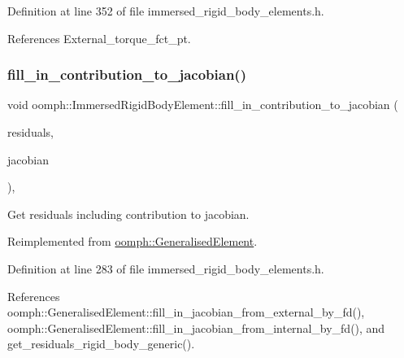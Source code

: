 Definition at line 352 of file immersed\+\_\+rigid\+\_\+body\+\_\+elements.\+h.



References External\+\_\+torque\+\_\+fct\+\_\+pt.

\mbox{\label{classoomph_1_1ImmersedRigidBodyElement_ac3a062f70718c9bf85a470c2eca2c60f}} 
\subsubsection{\texorpdfstring{fill\+\_\+in\+\_\+contribution\+\_\+to\+\_\+jacobian()}{fill\_in\_contribution\_to\_jacobian()}}
{\footnotesize\ttfamily void oomph\+::\+Immersed\+Rigid\+Body\+Element\+::fill\+\_\+in\+\_\+contribution\+\_\+to\+\_\+jacobian (\begin{DoxyParamCaption}\item[{\hyperlink{classoomph_1_1Vector}{Vector}$<$ double $>$ \&}]{residuals,  }\item[{\hyperlink{classoomph_1_1DenseMatrix}{Dense\+Matrix}$<$ double $>$ \&}]{jacobian }\end{DoxyParamCaption})\hspace{0.3cm}{\ttfamily [inline]}, {\ttfamily [virtual]}}



Get residuals including contribution to jacobian. 



Reimplemented from \hyperlink{classoomph_1_1GeneralisedElement_a6ae09fc0d68e4309ac1b03583d252845}{oomph\+::\+Generalised\+Element}.



Definition at line 283 of file immersed\+\_\+rigid\+\_\+body\+\_\+elements.\+h.



References oomph\+::\+Generalised\+Element\+::fill\+\_\+in\+\_\+jacobian\+\_\+from\+\_\+external\+\_\+by\+\_\+fd(), oomph\+::\+Generalised\+Element\+::fill\+\_\+in\+\_\+jacobian\+\_\+from\+\_\+internal\+\_\+by\+\_\+fd(), and get\+\_\+residuals\+\_\+rigid\+\_\+body\+\_\+generic().

